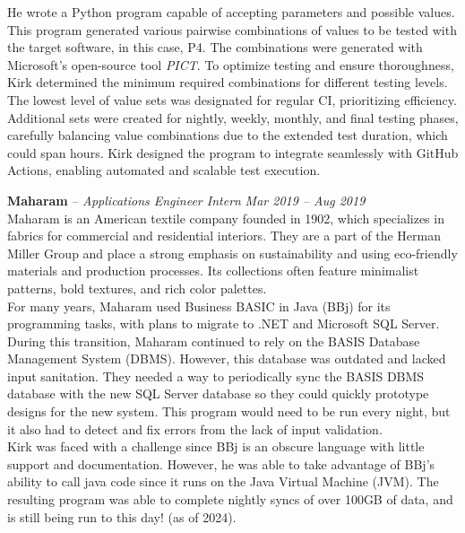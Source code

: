 \documentclass[10pt,letterpaper]{article}
\begin{document}
{	He wrote a Python program capable of accepting parameters and possible values. This program generated various pairwise combinations of values to be tested with the target software, in this case, P4. The combinations were generated with Microsoft's open-source tool {\it PICT}. To optimize testing and ensure thoroughness, Kirk determined the minimum required combinations for different testing levels. The lowest level of value sets was designated for regular CI, prioritizing efficiency. Additional sets were created for nightly, weekly, monthly, and final testing phases, carefully balancing value combinations due to the extended test duration, which could span hours. Kirk designed the program to integrate seamlessly with GitHub Actions, enabling automated and scalable test execution. \\
}

\headedsection
{\textbf{Maharam} -- \textit{Applications Engineer Intern}}
{\textit{Mar 2019 -- Aug 2019}} { \\

	Maharam is an American textile company founded in 1902, which specializes in fabrics for commercial and residential interiors. They are a part of the Herman Miller Group and place a strong emphasis on sustainability and using eco-friendly materials and production processes. Its collections often feature minimalist patterns, bold textures, and rich color palettes. \\

	For many years, Maharam used Business BASIC in Java (BBj) for its programming tasks, with plans to migrate to .NET and Microsoft SQL Server. During this transition, Maharam continued to rely on the BASIS Database Management System (DBMS). However, this database was outdated and lacked input sanitation. They needed a way to periodically sync the BASIS DBMS database with the new SQL Server database so they could quickly prototype designs for the new system. This program would need to be run every night, but it also had to detect and fix errors from the lack of input validation.  \\

	Kirk was faced with a challenge since BBj is an obscure language with little support and documentation. However, he was able to take advantage of BBj's ability to call java code since it runs on the Java Virtual Machine (JVM). The resulting program was able to complete nightly syncs of over 100GB of data, and is still being run to this day! (as of 2024). \\
}
\end{document}
